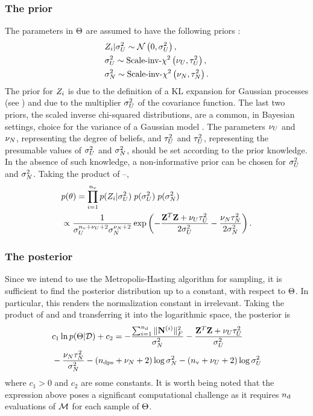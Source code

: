 \subsubsection{The prior}
The parameters in $\Theta$ are assumed to have the following priors \cite{marzouk2009}:
\begin{align}
  & \Z_i | \sigma^2_\U \sim \gaussian{0}{\sigma^2_\U}, \elabel{z-prior} \\
  & \sigma^2_\U \sim \sichisquared{\nu_\U}{\tau^2_\U}, \elabel{sigma2-u-prior}\\
  & \sigma^2_\noise \sim \sichisquared{\nu_\noise}{\tau^2_\noise}. \elabel{sigma2-noise-prior}
\end{align}
The prior for $Z_i$ is due to the definition of a KL expansion for Gaussian processes (see ) and due to the multiplier $\sigma^2_U$ of the covariance function. The last two priors, the scaled inverse chi-squared distributions, are a common, in Bayesian settings, choice for the variance of a Gaussian model \cite{gelman2004}. The parameters $\nu_U$ and $\nu_N$, representing the degree of beliefs, and $\tau^2_U$ and $\tau^2_U$, representing the presumable values of $\sigma^2_U$ and $\sigma^2_N$, should be set according to the prior knowledge. In the absence of such knowledge, a non-informative prior can be chosen for $\sigma^2_U$ and $\sigma^2_N$. Taking the product of --,
\begin{align}
  & \f{\param} = \prod_{i = 1}^\nvars \f{\Z_i | \sigma^2_\U} \; \f{\sigma^2_\U} \; \f{\sigma^2_\noise} \elabel{prior} \\
  & \propto \frac{1}{\sigma_\U^{\nvars + \nu_\U + 2} \sigma_\noise^{\nu_\noise + 2}} \exp\left( -\frac{\vZ^T\vZ + \nu_\U \tau_\U^2}{2 \sigma^2_\U} - \frac{\nu_\noise \tau_\noise^2}{2 \sigma^2_\noise} \right). \nonumber
\end{align}

\subsubsection{The posterior}
Since we intend to use the Metropolis-Hasting algorithm for sampling, it is sufficient to find the posterior distribution up to a constant, with respect to $\Theta$. In particular, this renders the normalization constant in  irrelevant. Taking the product of  and  and transferring it into the logarithmic space, the posterior is
\begin{align*}
  & c_1 \ln \f{\Param | \data} + c_2 = -\frac{\sum_{i = 1}^\ndata \fnorm{\mnoise^{(i)}}^2}{\sigma^2_\noise} -\frac{\vZ^T\vZ + \nu_\U \tau_\U^2}{\sigma^2_\U} \\
  & {} - \frac{\nu_\noise \tau_\noise^2}{\sigma^2_\noise} -(\ndcs + \nu_\noise + 2) \log \sigma^2_\noise - (\nvars + \nu_\U + 2) \log \sigma^2_\U
\end{align*}
where $c_1 > 0$ and $c_2$ are some constants. It is worth being noted that the expression above poses a significant computational challenge as it requires ${n_\text{d}}$ evaluations of $\model$ for each sample of $\Theta$.
